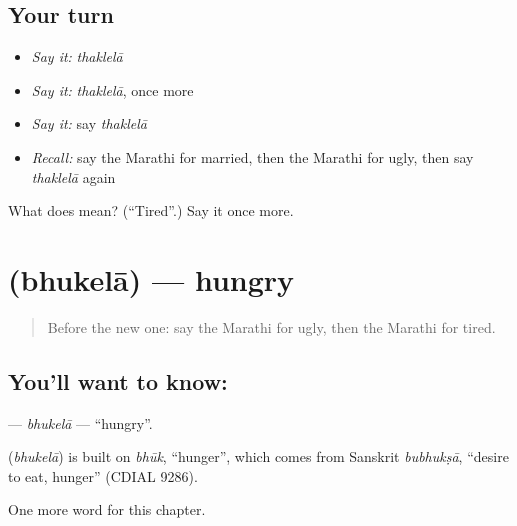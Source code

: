 \subsection*{Your turn}
\begin{itemize}
\raggedright
  \item \emph{Say it:} \emph{thaklelā}
  \item \emph{Say it:} \emph{thaklelā}, once more
  \item \emph{Say it:} say \emph{thaklelā}
  \item \emph{Recall:} say the Marathi for married, then the Marathi for ugly, then say \emph{thaklelā} again
\end{itemize}

\begin{tcolorbox}[breakable,colback=teal!4,colframe=teal!35!black,title={Before you move on}]
What does  mean? (\textquotedblleft{}Tired\textquotedblright{}.) Say it once more.
\end{tcolorbox}
\section[\texorpdfstring{\mr{भुकेला} (bhukelā)}{भुकेला (bhukelā)}]{ (bhukelā) — hungry}

\label{lesson:MR-C261-bhukela}



\begin{quote}
Before the new one: say the Marathi for ugly, then the Marathi for tired.
\end{quote}

\subsection*{You'll want to know: }
\textbf{} — \emph{bhukelā} — \textquotedblleft{}hungry\textquotedblright{}.

\begin{cousinweb}
\textbf{} (\emph{bhukelā}) is built on \emph{bhūk}, \textquotedblleft{}hunger\textquotedblright{}, which comes from Sanskrit \emph{bubhukṣā}, \textquotedblleft{}desire to eat, hunger\textquotedblright{} (CDIAL 9286).
\end{cousinweb}

\begin{grammarlens}[title={What you've built}]
One more word for this chapter.
\end{grammarlens}

